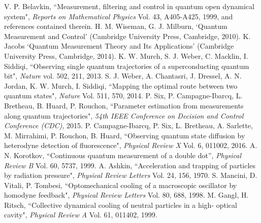 \documentclass[conference]{IEEEtran}
\begin{document}
%
%
%
\begin{thebibliography}{1}

 V. P. Belavkin, ``Measurement, filtering and control in quantum open dynamical system", {\em Reports on Mathematical Physics} Vol. 43, A405-A425, 1999, and references contained therein.
 H. M. Wiseman, G. J. Milburn, `Quantum Measurement and Control' (Cambridge University Press, Cambridge, 2010).
 K. Jacobs `Quantum Measurement Theory and Its Applications' (Cambridge University Press, Cambridge, 2014). 
 K. W. Murch, S. J. Weber, C. Macklin, I. Siddiqi, ``Observing single quantum trajectories of a superconducting quantum bit", {\em Nature} vol. 502, 211, 2013.
 S. J. Weber, A. Chantasri, J. Dressel, A. N. Jordan, K. W. Murch, I. Siddiqi, ``Mapping the optimal route between two quantum states", {\em Nature} Vol. 511, 570, 2014.
 P. Six, P. Campagne-Ibarcq, L. Bretheau, B. Huard, P. Rouchon, ``Parameter estimation from measurements along quantum trajectories", {\em 54th IEEE Conference on Decision and Control Conference (CDC)}, 2015.
 P. Campagne-Ibarcq, P. Six, L. Bretheau, A. Sarlette, M. Mirrahimi, P. Rouchon, B. Huard, ``Observing quantum state diffusion by heterodyne detection of fluorescence", {\em Physical Review X} Vol. 6, 011002, 2016.
A. N. Korotkov, ``Continuous quantum measurement of a double dot'', {\em Physical Review B} Vol. 60, 5737, 1999.
 A. Ashkin, ``Acceleration and trapping of particles by radiation pressure", {\em Physical Review Letters} Vol. 24, 156, 1970.
 S. Mancini, D. Vitali, P. Tombesi, ``Optomechanical cooling of a macroscopic oscillator by homodyne feedback", {\em Physical Review Letters} Vol. 80, 688, 1998.
 M. Gangl, H. Ritsch, ``Collective dynamical cooling of neutral particles in a high- optical cavity", {\em Physical Review A} Vol. 61, 011402, 1999.

\end{thebibliography}
\end{document}

